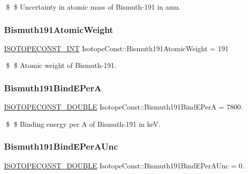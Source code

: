 \$ \$ Uncertainty in atomic mass of Bismuth-\/191 in amu. \mbox{\label{group___isotope_const-_bismuth-_bi191_gab0799338017e46621afd7f3723e1e69d}} 
\subsubsection{\texorpdfstring{Bismuth191\+Atomic\+Weight}{Bismuth191AtomicWeight}}
{\footnotesize\ttfamily \mbox{\hyperlink{group___isotope_const-_macros_ga5f18360b3e99483a35c32d789e62621c}{I\+S\+O\+T\+O\+P\+E\+C\+O\+N\+S\+T\+\_\+\+I\+NT}} Isotope\+Const\+::\+Bismuth191\+Atomic\+Weight = 191}

\$ \$ Atomic weight of Bismuth-\/191. \mbox{\label{group___isotope_const-_bismuth-_bi191_ga5b7503fceed29262aec7bf584b02d215}} 
\subsubsection{\texorpdfstring{Bismuth191\+Bind\+E\+PerA}{Bismuth191BindEPerA}}
{\footnotesize\ttfamily \mbox{\hyperlink{group___isotope_const-_macros_ga8f45a7272ce02c0b4c65c44636ed719a}{I\+S\+O\+T\+O\+P\+E\+C\+O\+N\+S\+T\+\_\+\+D\+O\+U\+B\+LE}} Isotope\+Const\+::\+Bismuth191\+Bind\+E\+PerA = 7800.}

\$ \$ Binding energy per A of Bismuth-\/191 in keV. \mbox{\label{group___isotope_const-_bismuth-_bi191_gadeb7dc86f827857a2a552b97b73f0251}} 
\subsubsection{\texorpdfstring{Bismuth191\+Bind\+E\+Per\+A\+Unc}{Bismuth191BindEPerAUnc}}
{\footnotesize\ttfamily \mbox{\hyperlink{group___isotope_const-_macros_ga8f45a7272ce02c0b4c65c44636ed719a}{I\+S\+O\+T\+O\+P\+E\+C\+O\+N\+S\+T\+\_\+\+D\+O\+U\+B\+LE}} Isotope\+Const\+::\+Bismuth191\+Bind\+E\+Per\+A\+Unc = 0.}

